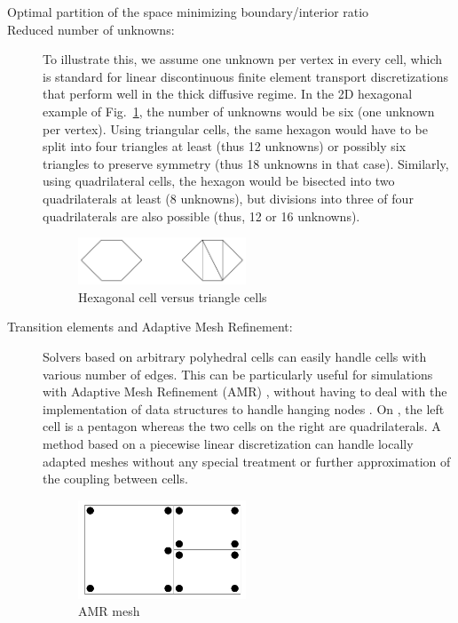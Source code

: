 \documentclass[preprint,10pt]{elsarticle}
\newcommand{\fig}[1]{Fig.~\ref{#1}}                      %
\renewcommand{\(}{\left(}
\renewcommand{\)}{\right)}
\renewcommand{\[}{\left[}
\renewcommand{\]}{\right]}
\begin{document}
\begin{description}
  \item[Optimal partition of the space minimizing boundary/interior ratio]
  \item[Reduced number of unknowns:] To illustrate this, we assume
    one unknown per vertex in every cell, which is standard for linear discontinuous
    finite element transport discretizations that perform well in the thick
    diffusive regime. In the 2D hexagonal example of \fig{fig_hex_vs_tri},
    the number of unknowns would be six (one unknown per vertex). Using
    triangular cells, the same hexagon would have to be split into four
    triangles at least (thus 12 unknowns) or possibly six triangles to
    preserve symmetry (thus 18 unknowns in that case). Similarly, using
    quadrilateral cells, the hexagon would be bisected into two quadrilaterals
    at least (8 unknowns), but divisions into three of four quadrilaterals are
    also possible (thus, 12 or 16 unknowns).
    \begin{figure}[H]
      \centering
      \includegraphics[width=5cm]{hex_tri_cells}
      \caption{Hexagonal cell versus triangle cells}
      \label{fig_hex_vs_tri}
    \end{figure}
  \item[Transition elements and Adaptive Mesh Refinement:] Solvers based on
    arbitrary polyhedral cells can easily handle cells with various number of
    edges. This can be particularly useful for simulations
    with Adaptive Mesh Refinement (AMR) \cite{Jessee1998,Baker2002,Wang2010a}, 
    without having to deal with the implementation of data structures to handle 
    hanging nodes \cite{Solin2008,Bangerth2007,Arnold2000}. On , 
    the left cell is a pentagon whereas the two cells on the right are 
    quadrilaterals. A method based on a piecewise linear discretization can
    handle locally adapted meshes without any special treatment or further
    approximation of the coupling between cells.
    \begin{figure}[H]
      \centering
      \includegraphics[width=5cm]{amr}
      \caption{AMR mesh}
      \label{fig_amr_cells}
    \end{figure}
\end{description}
\end{document}
